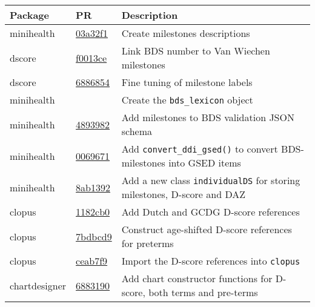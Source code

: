 \documentclass[
]{book}
\begin{document}
\begin{longtable}[]{@{}
  >{\raggedright\arraybackslash}p{}
  >{\raggedright\arraybackslash}p{}
  >{\raggedright\arraybackslash}p{}@{}}
\toprule
Package & PR & Description \\
\midrule
\endhead
minihealth & \href{https://github.com/growthcharts/minihealth/commit/03a32f1960e81a685bb749911e6ea297684ab4dc}{03a32f1} & Create milestones descriptions \\
dscore & \href{https://github.com/D-score/dscore/commit/f0013ce9a02d34ad25dd5c101c6a7c5b1444b53b}{f0013ce} & Link BDS number to Van Wiechen milestones \\
dscore & \href{https://github.com/D-score/dscore/commit/688685477082ac6c040b9d18035b5178a39a5cc0}{6886854} & Fine tuning of milestone labels \\
minihealth & & Create the \texttt{bds\_lexicon} object \\
minihealth & \href{https://github.com/stefvanbuuren/minihealth/commit/4893982631717539b070c8d19b88b2b10319f2ee}{4893982} & Add milestones to BDS validation JSON schema \\
minihealth & \href{https://github.com/stefvanbuuren/minihealth/commit/0069671c8d09f64f2436faa93b764bd288324fcc}{0069671} & Add \texttt{convert\_ddi\_gsed()} to convert BDS-milestones into GSED items \\
minihealth & \href{https://github.com/stefvanbuuren/minihealth/commit/8ab1392fdbe781adfa004fcadb4f661c14487cf2}{8ab1392} & Add a new class \texttt{individualDS} for storing milestones, D-score and DAZ \\
clopus & \href{https://github.com/stefvanbuuren/clopus/commit/1182cb02508a3207c0c9bcb35232851c38d24179}{1182cb0} & Add Dutch and GCDG D-score references \\
clopus & \href{https://github.com/stefvanbuuren/clopus/commit/7bdbcd9629bb215f466bbc2e2f886b6f16c5b5e9}{7bdbcd9} & Construct age-shifted D-score references for preterms \\
clopus & \href{https://github.com/stefvanbuuren/clopus/commit/ceab7f9547b9ae843a97b640d920ea0c36185053}{ceab7f9} & Import the D-score references into \texttt{clopus} \\
chartdesigner & \href{https://github.com/stefvanbuuren/chartdesigner/commit/68831906cef5cdca0d8851b057a01cc8be4fff6d}{6883190} & Add chart constructor functions for D-score, both terms and pre-terms \\

\end{longtable}
\end{document}
